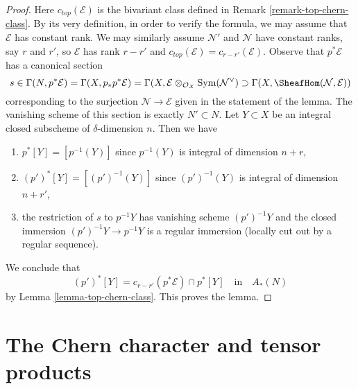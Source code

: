 \begin{proof}
Here $c_{top}(\mathcal{E})$ is the bivariant class defined in
Remark \ref{remark-top-chern-class}. By its very definition, in
order to verify the formula, we may assume that $\mathcal{E}$
has constant rank. We may similarly assume $\mathcal{N}'$ and
$\mathcal{N}$ have constant ranks, say $r$ and $r'$, so
$\mathcal{E}$ has rank $r - r'$ and
$c_{top}(\mathcal{E}) = c_{r - r'}(\mathcal{E})$.
Observe that $p^*\mathcal{E}$ has a canonical section
$$
s \in \Gamma(N, p^*\mathcal{E}) = \Gamma(X, p_*p^*\mathcal{E}) =
\Gamma(X, \mathcal{E} \otimes_{\mathcal{O}_X} \text{Sym}(\mathcal{N}^\vee)
\supset \Gamma(X, \SheafHom(\mathcal{N}, \mathcal{E}))
$$
corresponding to the surjection $\mathcal{N} \to \mathcal{E}$ given
in the statement of the lemma. The vanishing scheme of this section
is exactly $N' \subset N$. Let $Y \subset X$ be an integral closed
subscheme of $\delta$-dimension $n$. Then we have
\begin{enumerate}
\item $p^*[Y] = [p^{-1}(Y)]$ since $p^{-1}(Y)$ is integral of
dimension $n + r$,
\item $(p')^*[Y] = [(p')^{-1}(Y)]$ since $(p')^{-1}(Y)$ is integral of
dimension $n + r'$,
\item the restriction of $s$ to $p^{-1}Y$ has vanishing scheme
$(p')^{-1}Y$ and the closed immersion $(p')^{-1}Y \to p^{-1}Y$
is a regular immersion (locally cut out by a regular sequence).
\end{enumerate}
We conclude that
$$
(p')^*[Y] = c_{r - r'}(p^*\mathcal{E}) \cap p^*[Y]
\quad\text{in}\quad A_*(N)
$$
by Lemma \ref{lemma-top-chern-class}. This proves the lemma.
\end{proof}










\section{The Chern character and tensor products}
\label{section-chern-classes-tensor}

